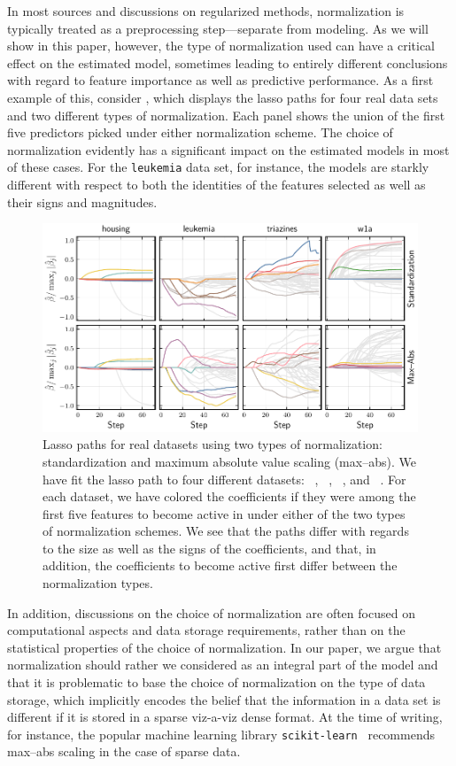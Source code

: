 In most sources and discussions on regularized methods, normalization is typically treated
as a preprocessing step---separate from modeling. As we will show in this paper, however,
the type of normalization used can have a critical effect on the estimated model, sometimes
leading to entirely different conclusions with regard to feature importance as well as
predictive performance. As a first example of this, consider ,
which displays the lasso paths for four real data sets and two different types of
normalization. Each panel shows the union of the first five predictors picked under either
normalization scheme. The choice of normalization evidently has a significant impact on the
estimated models in most of these cases. For the \texttt{leukemia} data set, for instance,
the models are starkly different with respect to both the identities of the features
selected as well as their signs and magnitudes.

\begin{figure}[bpt]
  \centering
  \includegraphics[]{plots/realdata_paths.pdf}
  \caption{%
    Lasso paths for real datasets using two types of normalization: standardization and maximum absolute value scaling (max--abs). We have fit the lasso path to four different datasets: ~\citep{harrison1978}, ~\citep{golub1999}, ~\citep{king}, and ~\citep{platt1998}. For each dataset, we have colored the coefficients if they were among the first five features to become active in under either of the two types of normalization schemes. We see that the paths differ with regards to the size as well as the signs of the coefficients, and that, in addition, the coefficients to become active first differ between the normalization types.
  }
  \label{fig:realdata-paths}
\end{figure}

In addition, discussions on the choice of normalization are often focused on computational
aspects and data storage requirements, rather than on the statistical properties of the
choice of normalization. In our paper, we argue that normalization should rather we
considered as an integral part of the model and that it is problematic to base the choice
of normalization on the type of data storage, which implicitly encodes the belief that the
information in a data set is different if it is stored in a sparse viz-a-viz dense format.
At the time of writing, for instance, the popular machine learning library
\texttt{scikit-learn}~\citep{scikit-learndevelopers2024} recommends max--abs scaling in the
case of sparse data.
